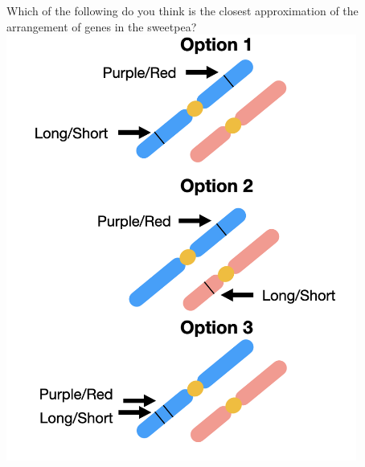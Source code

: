 \documentclass{beamer}
\begin{document}
\begin{frame}
\begin{center}
\begin{columns}
\begin{column}{0.5\textwidth}
			\end{column}
			\begin{column}{0.5\textwidth}
								\centering \small	Which of the following do you think is the closest approximation of the arrangement of genes in the sweetpea?\\
								\vspace{10pt}
									\includegraphics[keepaspectratio, width  =0.9\textwidth]{img/linkageHandsUp} \\
				
				
			\end{column}
		\end{columns}
	\end{center}
	
	
\end{frame}
\end{document}
